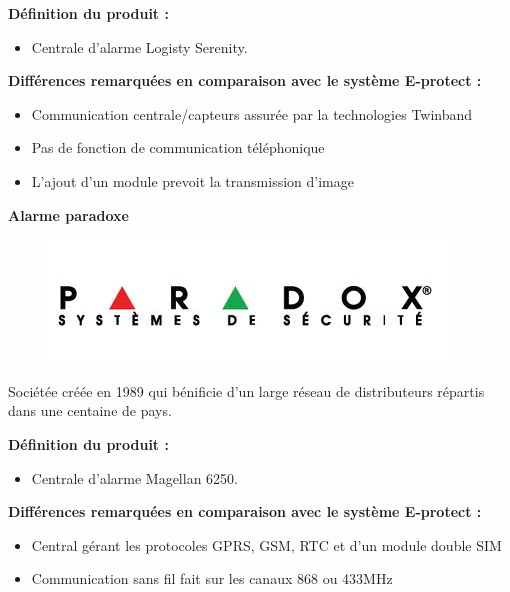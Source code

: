 \textbf{Définition du produit :}
\begin{itemize}
\item Centrale d'alarme Logisty Serenity.\\
\end{itemize}

\textbf{Différences remarquées en comparaison avec le système E-protect :}
\begin{itemize}
\item Communication centrale/capteurs assurée par la technologies Twinband
\item Pas de fonction de communication téléphonique
\item L'ajout d'un module prevoit la transmission d'image\\
\end{itemize}

\textbf{Alarme paradoxe}\\
\begin{figure}[h!]
	\begin{center}
		\includegraphics[width=0.4\linewidth]{../images/alarme_paradoxe}
	\end{center}
	\caption{\cite{www:alarme_paradoxe}}
\end{figure}

Sociétée créée en 1989 qui bénificie d'un large réseau de distributeurs répartis dans une centaine de pays.

\textbf{Définition du produit :}
\begin{itemize}
\item Centrale d'alarme Magellan 6250.
\end{itemize}

\textbf{Différences remarquées en comparaison avec le système E-protect :}
\begin{itemize}
\item Central gérant les protocoles GPRS, GSM, RTC et d'un module double SIM
\item Communication sans fil fait sur les canaux 868 ou 433MHz\\
\end{itemize}


